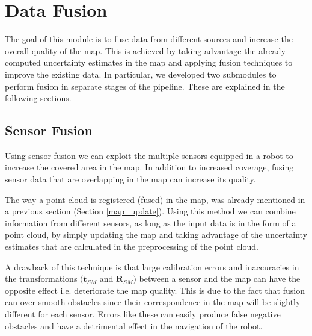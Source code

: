 
\section{Data Fusion}

The goal of this module is to fuse data from different sources and
increase the overall quality of the map.
This is achieved by taking advantage the already computed uncertainty
estimates in the map and applying fusion techniques to improve the
existing data.
In particular, we developed two submodules to perform fusion in separate
stages of the pipeline.
These are explained in the following sections.

\subsection{Sensor Fusion}

Using sensor fusion we can exploit the multiple sensors equipped in
a robot to increase the covered area in the map.
In addition to increased coverage, fusing sensor data that are overlapping
in the map can increase its quality.

The way a point cloud is registered (fused) in the map, was already mentioned
in a previous section (Section \ref{map_update}).
Using this method we can combine information from different sensors, as long
as the input data is in the form of a point cloud, by simply updating the map
and taking advantage of the uncertainty estimates that are calculated
in the preprocessing of the point cloud.


A drawback of this technique is that large calibration errors and inaccuracies
in the transformations $(\mathbf{t}_{SM}$ and $\mathbf{R}_{SM})$ between a
sensor and the map can have the opposite effect i.e. deteriorate the map
quality.
This is due to the fact that fusion can over-smooth obstacles
since their correspondence in the map will be slightly different
for each sensor.
Errors like these can easily produce false negative obstacles and
have a detrimental effect in the navigation of the robot.



